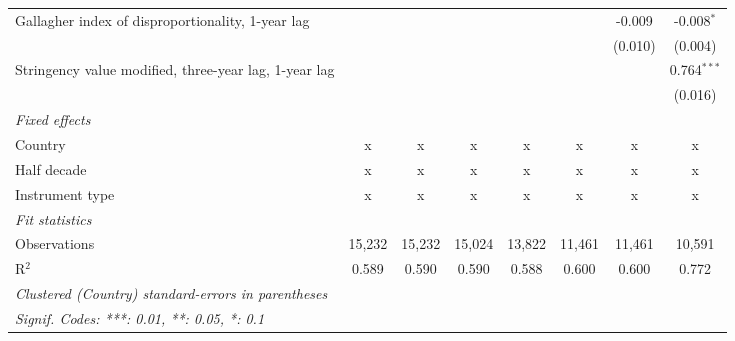 \begin{table}[htbp]
\begin{tabular}{lccccccc}
      Gallagher index of disproportionality, 1-year lag     &         &         &         &             &               & -0.009        & -0.008$^{*}$\\   
                                                            &         &         &         &             &               & (0.010)       & (0.004)\\   
      Stringency value modified, three-year lag, 1-year lag &         &         &         &             &               &               & 0.764$^{***}$\\   
                                                            &         &         &         &             &               &               & (0.016)\\   
      \emph{Fixed effects}\\
      Country                                               & x       & x       & x       & x           & x             & x             & x\\  
      Half decade                                           & x       & x       & x       & x           & x             & x             & x\\  
      Instrument type                                       & x       & x       & x       & x           & x             & x             & x\\  
      \midrule \emph{Fit statistics}\\
      Observations                                          & 15,232  & 15,232  & 15,024  & 13,822      & 11,461        & 11,461        & 10,591\\  
      R$^2$                                                 & 0.589   & 0.590   & 0.590   & 0.588       & 0.600         & 0.600         & 0.772\\  
      \midrule
      \multicolumn{8}{l}{\emph{Clustered (Country) standard-errors in parentheses}}\\
      \multicolumn{8}{l}{\emph{Signif. Codes: ***: 0.01, **: 0.05, *: 0.1}}\\
   \end{tabular}
\end{table}


